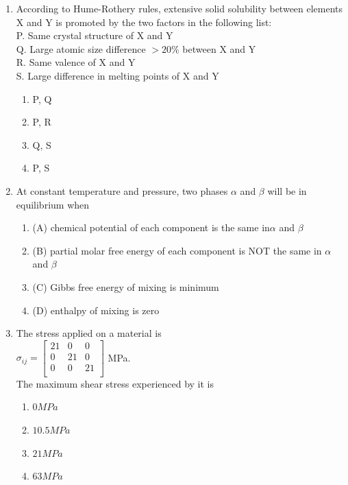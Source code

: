\documentclass[journal]{IEEEtran}
\theoremstyle{remark}
\begin{document}
\begin{enumerate}
\item According to Hume-Rothery rules, extensive solid solubility between elements X and Y is promoted by 
the two factors in the following list:\hfill{}\\
P. Same crystal structure of X and Y\\
Q. Large atomic size difference $>$$20\%$ between X and Y\\
R. Same valence of X and Y\\
S. Large difference in melting points of X and Y\\
\begin{multicols}{4}
\begin{enumerate}
\item  P, Q
\item  P, R
\item Q, S
\item P, S
\end{enumerate}
\end{multicols}

\item At constant temperature and pressure, two phases $\alpha$ and $\beta$ will be in equilibrium when\hfill{}\\
\begin{enumerate}
\item(A) chemical potential of each component is the same in$\alpha$  and $\beta$\\
\item (B) partial molar free energy of each component is NOT the same in $\alpha$  and $\beta$\\
\item (C) Gibbs free energy of mixing is minimum
\item (D) enthalpy of mixing is zero
\end{enumerate}

	\item  The stress applied on a material is
    \hfill{}\\
$\sigma_{ij} = 
\begin{bmatrix}
    21&0&0\\
    0&21&0\\
    0&0&21\\
\end{bmatrix}$ MPa.\\
The maximum shear stress experienced by it is
\begin{multicols}{4}
\begin{enumerate}
\item  $0 MPa$
\item  $10.5 MPa$
\item  $21 MPa$
\item  $63 MPa$
\end{enumerate}
\end{multicols}


\end{enumerate}
\end{document}
